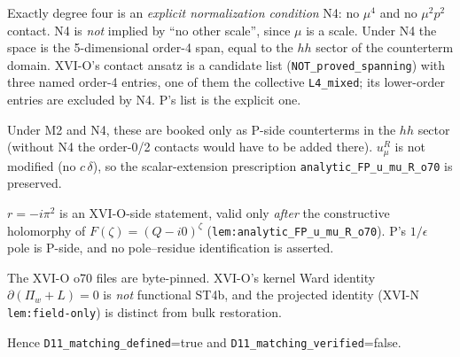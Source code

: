 \begin{description}
Exactly degree four is an \emph{explicit normalization condition} N4: no $\mu^4$ and no $\mu^2p^2$ contact. N4 is
\emph{not} implied by ``no other scale'', since $\mu$ is a scale. Under N4 the space is the 5-dimensional order-4 span,
equal to the $hh$ sector of the counterterm domain. XVI-O's contact ansatz is a candidate list
(\texttt{NOT\_proved\_spanning}) with three named order-4 entries, one of them the collective \texttt{L4\_mixed}; its
lower-order entries are excluded by N4. P's list is the explicit one.
\item[M4, finite adjustments.] Under M2 and N4, these are booked only as P-side counterterms in the $hh$ sector (without N4
the order-0/2 contacts would have to be added there). $u^R_\mu$ is not modified
(no $c\,\delta$), so the scalar-extension prescription \texttt{analytic\_FP\_u\_mu\_R\_o70} is preserved.
\item[M5, residue.] $r=-i\pi^2$ is an XVI-O-side statement, valid only \emph{after} the constructive holomorphy of
$F(\zeta)=(Q-i0)^\zeta$ (\texttt{lem:analytic\_FP\_u\_mu\_R\_o70}). P's $1/\epsilon$ pole is P-side, and no pole--residue
identification is asserted.
\item[M6/M7.] The XVI-O o70 files are byte-pinned. XVI-O's kernel Ward identity $\partial(\Pi_w+L)=0$ is
\emph{not} functional ST4b, and the projected identity (XVI-N \texttt{lem:field-only}) is distinct from bulk restoration.
\end{description}
Hence \texttt{D11\_matching\_defined}=true and \texttt{D11\_matching\_verified}=false.

